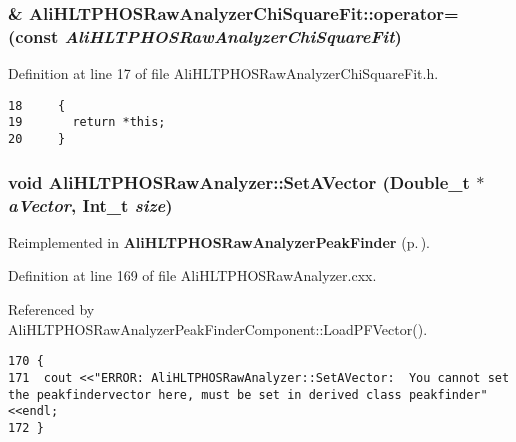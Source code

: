\subsubsection{\& Ali\-HLTPHOSRaw\-Analyzer\-Chi\-Square\-Fit::operator= (const  {\em Ali\-HLTPHOSRaw\-Analyzer\-Chi\-Square\-Fit})\hspace{0.3cm}{\tt  [inline]}}\label{classAliHLTPHOSRawAnalyzerChiSquareFit_AliHLTPHOSRawAnalyzerChiSquareFita2}




Definition at line 17 of file Ali\-HLTPHOSRaw\-Analyzer\-Chi\-Square\-Fit.h.

\footnotesize\begin{verbatim}18     {
19       return *this; 
20     }
\end{verbatim}\normalsize 


\subsubsection{\setlength{\rightskip}{0pt plus 5cm}void Ali\-HLTPHOSRaw\-Analyzer::Set\-AVector (Double\_\-t $\ast$ {\em a\-Vector}, Int\_\-t {\em size})\hspace{0.3cm}{\tt  [virtual, inherited]}}\label{classAliHLTPHOSRawAnalyzer_AliHLTPHOSRawAnalyzerLMSa17}




Reimplemented in {\bf Ali\-HLTPHOSRaw\-Analyzer\-Peak\-Finder} {\rm (p.\,\pageref{classAliHLTPHOSRawAnalyzerPeakFinder_AliHLTPHOSRawAnalyzerPeakFindera5})}.

Definition at line 169 of file Ali\-HLTPHOSRaw\-Analyzer.cxx.

Referenced by Ali\-HLTPHOSRaw\-Analyzer\-Peak\-Finder\-Component::Load\-PFVector().

\footnotesize\begin{verbatim}170 {
171  cout <<"ERROR: AliHLTPHOSRawAnalyzer::SetAVector:  You cannot set the peakfindervector here, must be set in derived class peakfinder"<<endl;
172 }
\end{verbatim}\normalsize 


